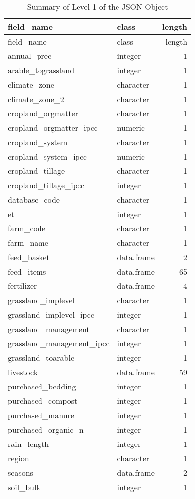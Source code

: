 \documentclass[
]{article}
\begin{document}
\begin{longtable}[]{@{}llr@{}}
\caption{Summary of Level 1 of the JSON Object}\tabularnewline
\toprule()
field\_name & class & length \\
\midrule()
\endfirsthead
\toprule()
field\_name & class & length \\
\midrule()
\endhead
annual\_prec & integer & 1 \\
arable\_tograssland & integer & 1 \\
climate\_zone & character & 1 \\
climate\_zone\_2 & character & 1 \\
cropland\_orgmatter & character & 1 \\
cropland\_orgmatter\_ipcc & numeric & 1 \\
cropland\_system & character & 1 \\
cropland\_system\_ipcc & numeric & 1 \\
cropland\_tillage & character & 1 \\
cropland\_tillage\_ipcc & integer & 1 \\
database\_code & character & 1 \\
et & integer & 1 \\
farm\_code & character & 1 \\
farm\_name & character & 1 \\
feed\_basket & data.frame & 2 \\
feed\_items & data.frame & 65 \\
fertilizer & data.frame & 4 \\
grassland\_implevel & character & 1 \\
grassland\_implevel\_ipcc & integer & 1 \\
grassland\_management & character & 1 \\
grassland\_management\_ipcc & integer & 1 \\
grassland\_toarable & integer & 1 \\
livestock & data.frame & 59 \\
purchased\_bedding & integer & 1 \\
purchased\_compost & integer & 1 \\
purchased\_manure & integer & 1 \\
purchased\_organic\_n & integer & 1 \\
rain\_length & integer & 1 \\
region & character & 1 \\
seasons & data.frame & 2 \\
soil\_bulk & integer & 1 \\

\end{longtable}
\end{document}

